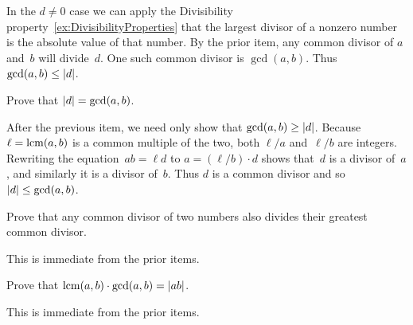 \documentclass{test}  %
\begin{document}
\begin{euclidproof}
\begin{problem}
\begin{exes}
\begin{answer}
  In the $d\neq 0$ case we can apply the 
  Divisibility property~\ref{ex:DivisibilityProperties} that the
  largest divisor of a nonzero number is the absolute value of that number.
  By the prior item, any common divisor of $a$ and~$b$ will divide~$d$.
  One such common divisor is $\gcd(a,b)$.
  Thus $\gcd(a,b)\leq\lvert d\rvert$.  
\end{answer}
\begin{exercise} 
  Prove that $\lvert d\rvert=\gcd(a,b)$. 
\end{exercise}
\begin{answer}
  After the previous item, we need only show that $\gcd(a,b)\geq\lvert d\rvert$. 
  Because $\ell=\operatorname{lcm}(a,b)$ is a common multiple of the two, 
  both $\ell/a$ and~$\ell/b$ are integers. 
  Rewriting the equation~$ab=\ell d$ to 
  $a=(\ell/b)\cdot d$ shows that~$d$ is a divisor of~$a$, and similarly
  it is a divisor of~$b$.
  Thus $d$ is a common divisor and so $\lvert d\rvert\leq \gcd(a,b)$.  
\end{answer}
\begin{exercise} 
  Prove that any common divisor of two numbers also divides their
  greatest common divisor.
\end{exercise}
\begin{answer}
  This is immediate from the prior items.  
\end{answer}
\begin{exercise} 
  Prove that $\operatorname{lcm}(a,b)\cdot\gcd(a,b)=\lvert ab\rvert$. 
\end{exercise}
\begin{answer}
  This is immediate from the prior items.
\end{answer}
\end{exes}  


\end{problem}
\end{euclidproof}
\end{document}

